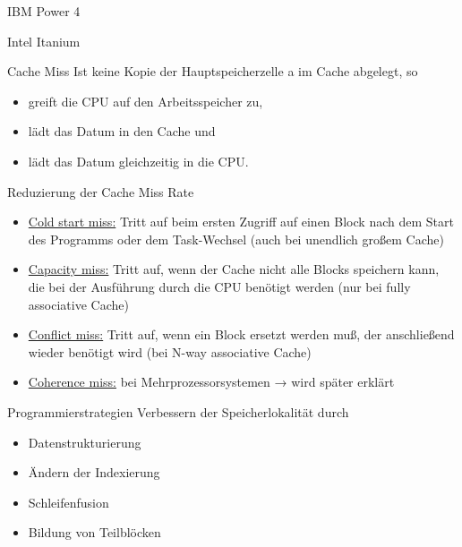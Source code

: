 \begin{bonus}[Cache]{IBM Power 4}

\end{bonus}

\begin{bonus}[Cache]{Intel Itanium}

\end{bonus}

\begin{defi}{Cache Miss}
    Ist keine Kopie der Hauptspeicherzelle a im Cache abgelegt, so
    \begin{itemize}
        \item greift die CPU auf den Arbeitsspeicher zu,
        \item lädt das Datum in den Cache und
        \item lädt das Datum gleichzeitig in die CPU.
    \end{itemize}
\end{defi}

\begin{defi}{Reduzierung der Cache Miss Rate}
    \begin{itemize}
        \item \underline{Cold start miss:} Tritt auf beim ersten Zugriff auf einen Block nach dem Start des Programms oder dem Task-Wechsel (auch bei unendlich großem Cache)
        \item \underline{Capacity miss:} Tritt auf, wenn der Cache nicht alle Blocks speichern kann, die bei der Ausführung durch die CPU benötigt werden (nur bei fully associative Cache)
        \item \underline{Conflict miss:} Tritt auf, wenn ein Block ersetzt werden muß, der anschließend wieder benötigt wird (bei N-way associative Cache)
        \item \underline{Coherence miss:} bei Mehrprozessorsystemen → wird später erklärt
    \end{itemize}
\end{defi}

\begin{defi}{Programmierstrategien}
    Verbessern der Speicherlokalität durch
    \begin{itemize}[\ldots]
        \item Datenstrukturierung
        \item Ändern der Indexierung
        \item Schleifenfusion
        \item Bildung von Teilblöcken
    \end{itemize}
\end{defi}

